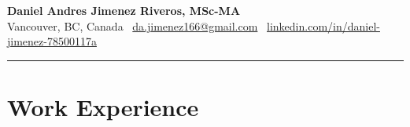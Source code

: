 \documentclass[10pt,a4paper]{article}
\begin{document}
\titlespacing*{\section}{0pt}{0pt}{10pt} 
\titlespacing*{\subsection}{0pt}{10pt}{5pt} 
\titlespacing*{\section}{0pt}{0pt}{4pt}


\pagestyle{empty}

{
\centering
{\Huge\textbf{Daniel Andres Jimenez Riveros, MSc-MA}}\\
\medskip 
Vancouver, BC, Canada \textbar\ \href{mailto:da.jimenez166@gmail.com}{da.jimenez166@gmail.com} \textbar\ \href{https://www.linkedin.com/in/daniel-jimenez-78500117a/}{linkedin.com/in/daniel-jimenez-78500117a}\\
}




\rule{\textwidth}{0.4pt} 

\section*{Work Experience}
\end{document}
